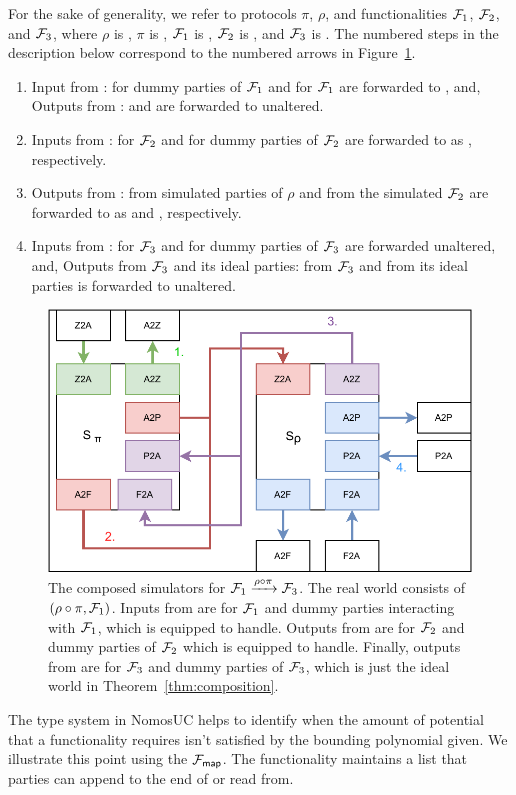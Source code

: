 For the sake of generality, we refer to protocols $\pi$, $\rho$, and functionalities $\mathcal{F}_1$, $\mathcal{F}_2$, and $\mathcal{F}_3$, where $\rho$ is , $\pi$ is , $\mathcal{F}_1$ is \Fro, $\mathcal{F}_2$ is \Fcom, and $\mathcal{F}_3$ is \Fflip.
The numbered steps in the description below correspond to the numbered arrows in Figure~\ref{fig:simcomp}.
\begin{enumerate}
\item Input from \Z:  for dummy parties of $\mathcal{F}_1$ and  for $\mathcal{F}_1$  are forwarded to \SIM{\pi}, and, Outputs from \SIM{\pi}:  and  are forwarded to \Z unaltered.
\item Inputs from \SIM{\pi}:  for $\mathcal{F}_2$ and  for dummy parties of $\mathcal{F}_2$ are forwarded to \SIM{\rho} as  , respectively.
\item Outputs from \SIM{\rho}:  from simulated parties of $\rho$  and  from the simulated $\mathcal{F}_2$ are forwarded to \SIM{\pi} as  and , respectively.
\item Inputs from \SIM{\rho}:  for $\mathcal{F}_3$ and  for dummy parties of $\mathcal{F}_3$ are forwarded unaltered, and, Outputs from $\mathcal{F}_3$ and its ideal parties:  from $\mathcal{F}_3$ and  from its ideal parties is forwarded to \SIM{\rho} unaltered.
\end{enumerate}

\begin{figure}
\centering
\includegraphics[scale=0.5]{figures/simcomp.pdf}
\caption{The composed simulators for $\mathcal{F}_1 \xrightarrow{\rho \circ \pi} \mathcal{F}_3$. The real world consists of $(\rho \circ \pi, \mathcal{F}_1)$. Inputs from \Z are for $\mathcal{F}_1$ and dummy parties interacting with $\mathcal{F}_1$, which \SIM{\pi} is equipped to handle. Outputs from \SIM{\pi} are for $\mathcal{F}_2$ and dummy parties of $\mathcal{F}_2$ which \SIM{\rho} is equipped to handle. Finally, outputs from \SIM{\rho} are for $\mathcal{F}_3$ and dummy parties of $\mathcal{F}_3$, which is just the ideal world in Theorem~\ref{thm:composition}.}
\label{fig:simcomp}
\end{figure}


The type system in NomosUC helps to identify when the amount of potential that a functionality requires isn't satisfied by the bounding polynomial given.
We illustrate this point using the $\mathcal{F}_{{\mathsf {map}}}$. 
The functionality maintains a list that parties can append to the end of or read from.

